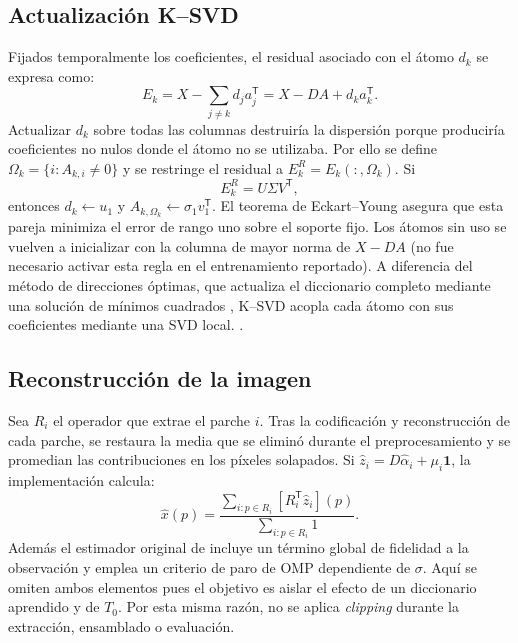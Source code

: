 \documentclass[conference]{IEEEtran}
\begin{document}
\subsection{Actualización K--SVD}
Fijados temporalmente los coeficientes, el residual asociado con el átomo $d_k$ se expresa como:
\begin{equation}
 E_k=X-\sum_{j\neq k}d_ja_j^{\mathsf T}=X-DA+d_ka_k^{\mathsf T}.
\end{equation}
Actualizar $d_k$ sobre todas las columnas destruiría la dispersión porque produciría coeficientes no nulos donde el átomo no se utilizaba. Por ello se define $\Omega_k=\{i:A_{k,i}\neq0\}$ y se restringe el residual a $E_k^{R}=E_k(:,\Omega_k)$. Si
\begin{equation}
 E_k^{R}=U\Sigma V^{\mathsf T},
\end{equation}
entonces $d_k\leftarrow u_1$ y $A_{k,\Omega_k}\leftarrow\sigma_1v_1^{\mathsf T}$. El teorema de Eckart--Young asegura que esta pareja minimiza el error de rango uno sobre el soporte fijo. Los átomos sin uso se vuelven a inicializar con la columna de mayor norma de $X-DA$ (no fue necesario activar esta regla en el entrenamiento reportado). A diferencia del método de direcciones óptimas, que actualiza el diccionario completo mediante una solución de mínimos cuadrados \cite{engan}, K--SVD acopla cada átomo con sus coeficientes mediante una SVD local.
\cite{rubinstein}.

\subsection{Reconstrucción de la imagen}
Sea $R_i$ el operador que extrae el parche $i$. Tras la codificación y reconstrucción de cada parche, se restaura la media que se eliminó durante el preprocesamiento y se promedian las contribuciones en los píxeles solapados. Si $\widehat z_i=D\widehat\alpha_i+\mu_i\mathbf{1}$, la implementación calcula:
\begin{equation}
 \widehat x(p)=\frac{\sum_{i:p\in R_i} [R_i^{\mathsf T}\widehat z_i](p)}
 {\sum_{i:p\in R_i}1}.
 \label{eq:aggregation}
\end{equation}
Además el estimador original de \cite{elad} incluye un término global de fidelidad a la observación y emplea un criterio de paro de OMP dependiente de $\sigma$. Aquí se omiten ambos elementos pues el objetivo es aislar el efecto de un diccionario aprendido y de $T_0$. Por esta misma razón, no se aplica \emph{clipping} durante la extracción, ensamblado o evaluación.
\end{document}
